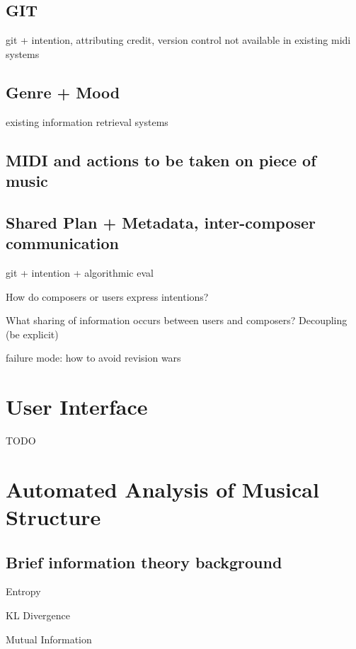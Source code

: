 \documentclass[final,authoryear,11pt,times]{elsarticle}
\begin{document}
\subsection{GIT}

git + intention, attributing credit, version control not available in existing midi systems

\subsection{Genre + Mood}

existing information retrieval systems


\subsection{MIDI and actions to be taken on piece of music}


\subsection{Shared Plan + Metadata, inter-composer communication}

git + intention + algorithmic eval

How do composers or users express intentions?

What sharing of information occurs between users and composers? Decoupling (be explicit)

failure mode: how to avoid revision wars

\section{User Interface}

TODO








\section{Automated Analysis of Musical Structure}

\subsection{Brief information theory background}

Entropy

KL Divergence

Mutual Information
\end{document}
